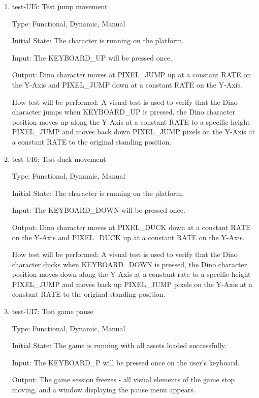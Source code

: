 \documentclass[12pt, titlepage]{article}
\begin{document}
\begin{enumerate}

\item{test-UI5: Test jump movement\\}

Type: Functional, Dynamic, Manual
					
Initial State: The character is running on the platform.
					
Input: The KEYBOARD\_UP will be pressed once.
					
Output: Dino character moves at PIXEL\_JUMP up at a constant RATE on the Y-Axis and PIXEL\_JUMP down at a constant RATE on the Y-Axis.
					
How test will be performed: A visual test is used to verify that the Dino character jumps when KEYBOARD\_UP is pressed, the Dino character position moves up along the Y-Axis at a constant RATE to a specific height PIXEL\_JUMP and moves back down PIXEL\_JUMP pixels on the Y-Axis at a constant RATE to the original standing position.
					
\item{test-UI6: Test duck movement\\}

Type: Functional, Dynamic, Manual
					
Initial State: The character is running on the platform.
					
Input: The KEYBOARD\_DOWN will be pressed once.
					
Output: Dino character moves at PIXEL\_DUCK down at a constant RATE on the Y-Axis and PIXEL\_DUCK up at a constant RATE on the Y-Axis.
					
How test will be performed: A visual test is used to verify that the Dino character ducks when KEYBOARD\_DOWN is pressed, the Dino character position moves down along the Y-Axis at a constant rate to a specific height PIXEL\_JUMP and moves back up PIXEL\_JUMP pixels on the Y-Axis at a constant RATE to the original standing position.

\item{test-UI7: Test game pause\\}

Type: Functional, Dynamic, Manual
					
Initial State: The game is running with all assets loaded successfully.
					
Input: The KEYBOARD\_P will be pressed once on the user's keyboard.
					
Output: The game session freezes - all visual elements of the game stop moving, and a window displaying the pause menu appears.
					

\end{enumerate}
\end{document}
